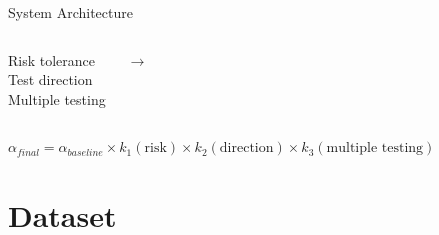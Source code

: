 \begin{frame}{System Architecture}
\begin{columns}[T]
{\begin{minipage}[t][6cm][t]{\linewidth}
				{\small
					Risk tolerance\\
					Test direction\\
					Multiple testing
				}
			\end{minipage}
		}
		
		\centering
		\vspace{3cm}
		\small $\rightarrow$
		
		
	\end{columns}
	
	\vspace{0.2cm}
	
	\centering
	\small
	$\alpha_{final} =
	\alpha_{baseline}
	\times k_1(\text{risk})
	\times k_2(\text{direction})
	\times k_3(\text{multiple testing})$
	
\end{frame}
\section{Dataset}

